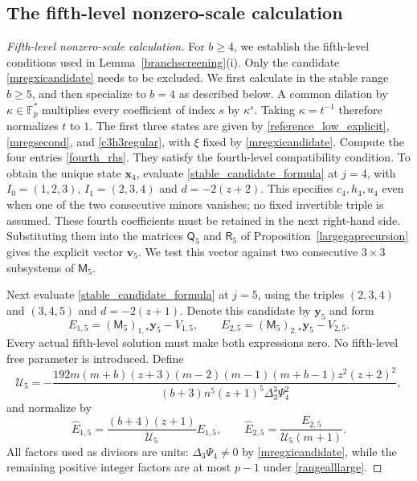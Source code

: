 \documentclass[10pt,a4paper]{amsart}
\newcommand{\F}{\mathbb{F}_p}
\begin{document}
\subsection{The fifth-level nonzero-scale calculation}\label{app:fifth}

\begin{proof}[Fifth-level nonzero-scale calculation]
For $b\ge4$, we establish the fifth-level conditions used in
Lemma~\ref{branchscreening}(i).  Only the candidate
\eqref{mregxicandidate} needs to be excluded.  We first calculate in the
stable range $b\ge5$, and then specialize to $b=4$ as described below.
A common dilation by $\kappa\in\F^*$ multiplies every coefficient
of index $s$ by $\kappa^s$.  Taking $\kappa=t^{-1}$ therefore
normalizes $t$ to $1$.
The first three states are given by \eqref{reference_low_explicit},
\eqref{mregsecond}, and \eqref{c3h3regular}, with $\xi$ fixed by
\eqref{mregxicandidate}.
Compute the four entries \eqref{fourth_rhs}.  They satisfy the
fourth-level compatibility condition.  To obtain the unique state
$\mathbf x_4$, evaluate \eqref{stable_candidate_formula} at $j=4$,
with $I_0=(1,2,3)$, $I_1=(2,3,4)$ and $d=-2(z+2)$.
This specifies $c_4,h_4,u_4$ even when one of the two consecutive
minors vanishes; no fixed invertible triple is assumed.
These fourth coefficients must be retained in the next right-hand
side.  Substituting them into the matrices $\mathsf Q_5$ and
$\mathsf R_5$ of Proposition~\ref{largegaprecursion} gives the explicit
vector $\mathbf v_5$.  We test this vector against two consecutive $3\times3$ subsystems
of $\mathsf M_5$.

Next evaluate \eqref{stable_candidate_formula} at $j=5$, using the
triples $(2,3,4)$ and $(3,4,5)$ and $d=-2(z+1)$.
Denote this candidate by $\mathbf y_5$ and form
\[
 E_{1,5}=(\mathsf M_5)_{1,*}\mathbf y_5-V_{1,5},\qquad
 E_{2,5}=(\mathsf M_5)_{2,*}\mathbf y_5-V_{2,5}.
\]
Every actual fifth-level solution must make both expressions zero.
No fifth-level free parameter is introduced.  Define
\begin{equation}\label{U5}
 \mathcal U_5=-\frac{192m(m+b)(z+3)(m-2)(m-1)(m+b-1)z^2(z+2)^2}
 {(b+3)n^5(z+1)^5\Delta_3^3\Psi_4^2},
\end{equation}
and normalize by
\[
 \widehat E_{1,5}=\frac{(b+4)(z+1)}{\mathcal U_5}E_{1,5},
 \qquad
 \widehat E_{2,5}=\frac{E_{2,5}}{\mathcal U_5(m+1)}.
\]
All factors used as divisors are units: $\Delta_3\Psi_4\ne0$ by
\eqref{mregxicandidate}, while the remaining positive integer factors
are at most $p-1$ under \eqref{rangealllarge}.


\end{proof}
\end{document}
